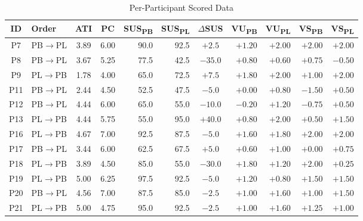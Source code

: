 ﻿%
\begin{table}[htbp]
    \centering
    \begin{threeparttable}
        \caption{Per-Participant Scored Data}
        \label{tab:raw-data}
        \small
        \begin{tabular}{clccrrcrrrr}
            \toprule
            \textbf{ID} & \textbf{Order} & \textbf{ATI} & \textbf{PC} & \textbf{SUS\textsubscript{PB}} & \textbf{SUS\textsubscript{PL}} & \textbf{$\Delta$SUS} & \textbf{VU\textsubscript{PB}} & \textbf{VU\textsubscript{PL}} & \textbf{VS\textsubscript{PB}} & \textbf{VS\textsubscript{PL}} \\
            \midrule
            P7 & PB$\rightarrow$PL & 3.89 & 6.00 & 90.0 & 92.5 & $+2.5$ & $+1.20$ & $+2.00$ & $+2.00$ & $+2.00$ \\
            P8 & PB$\rightarrow$PL & 3.67 & 5.25 & 77.5 & 42.5 & $-35.0$ & $+0.80$ & $+0.60$ & $+0.75$ & $-0.50$ \\
            P9 & PL$\rightarrow$PB & 1.78 & 4.00 & 65.0 & 72.5 & $+7.5$ & $+1.80$ & $+2.00$ & $+1.00$ & $+2.00$ \\
            P11 & PB$\rightarrow$PL & 2.44 & 4.50 & 52.5 & 47.5 & $-5.0$ & $+0.00$ & $+0.80$ & $-1.50$ & $+0.50$ \\
            P12 & PB$\rightarrow$PL & 4.44 & 6.00 & 65.0 & 55.0 & $-10.0$ & $-0.20$ & $+1.20$ & $-0.75$ & $+0.50$ \\
            P13 & PL$\rightarrow$PB & 4.44 & 5.75 & 55.0 & 95.0 & $+40.0$ & $+0.80$ & $+2.00$ & $+0.50$ & $+1.50$ \\
            P16 & PL$\rightarrow$PB & 4.67 & 7.00 & 92.5 & 87.5 & $-5.0$ & $+1.60$ & $+1.80$ & $+2.00$ & $+2.00$ \\
            P17 & PB$\rightarrow$PL & 3.44 & 6.00 & 62.5 & 67.5 & $+5.0$ & $+0.60$ & $+1.00$ & $+0.00$ & $+0.75$ \\
            P18 & PL$\rightarrow$PB & 3.89 & 4.50 & 85.0 & 55.0 & $-30.0$ & $+1.80$ & $+1.20$ & $+2.00$ & $+0.25$ \\
            P19 & PL$\rightarrow$PB & 5.00 & 6.25 & 97.5 & 92.5 & $-5.0$ & $+1.20$ & $+0.80$ & $+1.50$ & $+1.50$ \\
            P20 & PB$\rightarrow$PL & 4.56 & 7.00 & 87.5 & 85.0 & $-2.5$ & $+1.00$ & $+1.60$ & $+1.00$ & $+1.50$ \\
            P21 & PL$\rightarrow$PB & 5.00 & 4.75 & 95.0 & 92.5 & $-2.5$ & $+1.00$ & $+1.60$ & $+1.25$ & $+1.00$ \\

\end{tabular}
\end{threeparttable}
\end{table}
